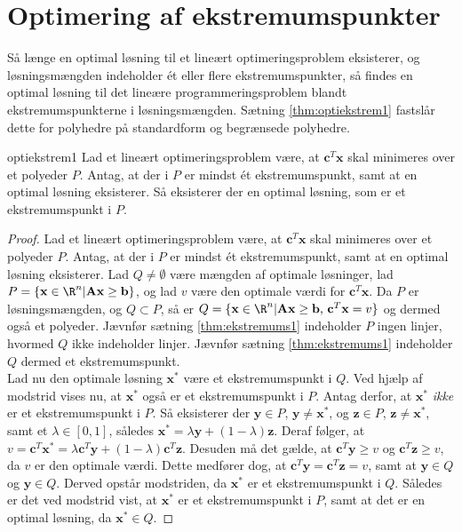 \section{Optimering af ekstremumspunkter}
%
Så længe en optimal løsning til et lineært optimeringsproblem eksisterer, og løsningsmængden indeholder ét eller flere ekstremumspunkter, så findes en optimal løsning til det lineære programmeringsproblem blandt ekstremumspunkterne i løsningsmængden. 
Sætning \ref{thm:optiekstrem1} fastslår dette for polyhedre på standardform og begrænsede polyhedre. 
%
\begin{thm}{}{optiekstrem1}
Lad et lineært optimeringsproblem være, at $\textbf{c}^T \textbf{x}$ skal minimeres over et polyeder $P$. 
Antag, at der i $P$ er mindst ét ekstremumspunkt, samt at en optimal løsning eksisterer. 
Så eksisterer der en optimal løsning, som er et ekstremumspunkt i $P$.
\end{thm}
%
%
\begin{proof}
Lad et lineært optimeringsproblem være, at $\textbf{c}^T \textbf{x}$ skal minimeres over et polyeder $P$. 
Antag, at der i $P$ er mindst ét ekstremumspunkt, samt at en optimal løsning eksisterer. 
Lad $Q \neq \emptyset $ være mængden af optimale løsninger, lad $P = \{\textbf{x} \in \R^n | \textbf{A}\textbf{x} \geq \textbf{b} \}$, og lad $v$ være den optimale værdi for $\textbf{c}^T \textbf{x}$. 
Da $P$ er løsningsmængden, og $Q \subset P$, så er $Q = \{\textbf{x} \in \R^n | \textbf{A}\textbf{x} \geq \textbf{b} \text{, } \textbf{c}^T \textbf{x} = v \}$ og dermed også et polyeder. 
Jævnfør sætning \ref{thm:ekstremums1} indeholder $P$ ingen linjer, hvormed $Q$ ikke indeholder linjer. 
Jævnfør sætning \ref{thm:ekstremums1} indeholder $Q$ dermed et ekstremumspunkt. \\
Lad nu den optimale løsning $\textbf{x}^*$ være et ekstremumspunkt i $Q$. 
Ved hjælp af modstrid vises nu, at $\textbf{x}^*$ også er et ekstremumspunkt i $P$. 
Antag derfor, at $\textbf{x}^*$ \textit{ikke} er et ekstremumspunkt i $P$. 
Så eksisterer der $\textbf{y} \in P$, $\textbf{y} \neq \textbf{x}^*$, og $\textbf{z} \in P$, $\textbf{z} \neq \textbf{x}^*$, samt et $\lambda \in [0,1]$, således $ \textbf{x}^* = \lambda \textbf{y} + (1 - \lambda) \textbf{z}$. 
Deraf følger, at $v = \textbf{c}^T \textbf{x}^* =  \lambda \textbf{c}^T \textbf{y} + (1 - \lambda) \textbf{c}^T \textbf{z}$. 
Desuden må det gælde, at $\textbf{c}^T \textbf{y} \geq v$ og $\textbf{c}^T \textbf{z} \geq v$, da $v$ er den optimale værdi. 
Dette medfører dog, at $ \textbf{c}^T \textbf{y} = \textbf{c}^T \textbf{z} = v$, samt at $\textbf{y} \in Q$ og $\textbf{y} \in Q$. 
Derved opstår modstriden, da $\textbf{x}^*$ er et ekstremumspunkt i $Q$. 
Således er det ved modstrid vist, at $\textbf{x}^*$ er et ekstremumspunkt i $P$, samt at det er en optimal løsning, da $\textbf{x}^* \in Q$. 
\end{proof}\\
